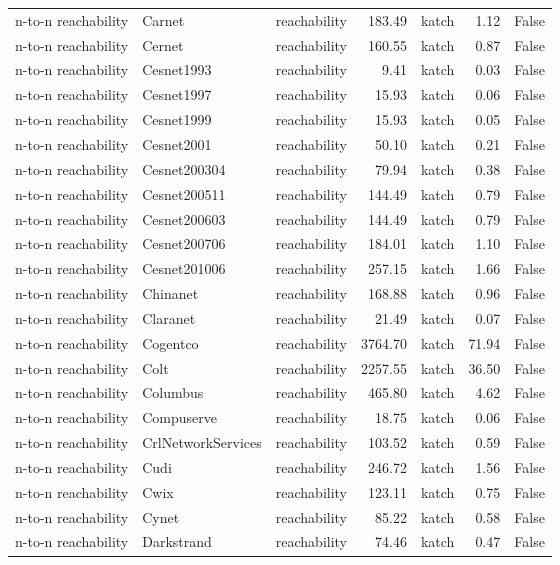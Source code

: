 \begin{tabular}{lllrlrr}
n-to-n reachability & Carnet & reachability & 183.49 & katch & 1.12 & False \\
n-to-n reachability & Cernet & reachability & 160.55 & katch & 0.87 & False \\
n-to-n reachability & Cesnet1993 & reachability & 9.41 & katch & 0.03 & False \\
n-to-n reachability & Cesnet1997 & reachability & 15.93 & katch & 0.06 & False \\
n-to-n reachability & Cesnet1999 & reachability & 15.93 & katch & 0.05 & False \\
n-to-n reachability & Cesnet2001 & reachability & 50.10 & katch & 0.21 & False \\
n-to-n reachability & Cesnet200304 & reachability & 79.94 & katch & 0.38 & False \\
n-to-n reachability & Cesnet200511 & reachability & 144.49 & katch & 0.79 & False \\
n-to-n reachability & Cesnet200603 & reachability & 144.49 & katch & 0.79 & False \\
n-to-n reachability & Cesnet200706 & reachability & 184.01 & katch & 1.10 & False \\
n-to-n reachability & Cesnet201006 & reachability & 257.15 & katch & 1.66 & False \\
n-to-n reachability & Chinanet & reachability & 168.88 & katch & 0.96 & False \\
n-to-n reachability & Claranet & reachability & 21.49 & katch & 0.07 & False \\
n-to-n reachability & Cogentco & reachability & 3764.70 & katch & 71.94 & False \\
n-to-n reachability & Colt & reachability & 2257.55 & katch & 36.50 & False \\
n-to-n reachability & Columbus & reachability & 465.80 & katch & 4.62 & False \\
n-to-n reachability & Compuserve & reachability & 18.75 & katch & 0.06 & False \\
n-to-n reachability & CrlNetworkServices & reachability & 103.52 & katch & 0.59 & False \\
n-to-n reachability & Cudi & reachability & 246.72 & katch & 1.56 & False \\
n-to-n reachability & Cwix & reachability & 123.11 & katch & 0.75 & False \\
n-to-n reachability & Cynet & reachability & 85.22 & katch & 0.58 & False \\
n-to-n reachability & Darkstrand & reachability & 74.46 & katch & 0.47 & False \\

\end{tabular}
